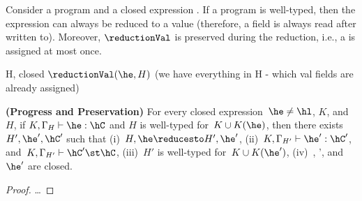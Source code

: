 \documentclass[9pt,a4paper]{article}
\begin{document}
Consider a program \hP and a closed expression \he.
If a program is well-typed, then the expression can always be reduced to a value
    (therefore, a field is always read after written to).
Moreover, $\reductionVal$ is preserved during the reduction,
    i.e., a \hval is assigned at most once.



H, \he closed
$\reductionVal(\he,H)$  (we have everything in H - which val fields are already assigned)



\begin{Theorem}[preservation]
  \textbf{(Progress and Preservation)}
    For every closed expression~$\he \neq \hl$, $K$, and $H$,
        if $K,\Gamma_{H} \vdash \he : \hC$ and $H$ is well-typed for~$K \cup K(\he)$,
        then there exists~$H',\he',\hC'$ such that
        (i)~$H,\he \reducesto H',\he'$,
        (ii)~$K,\Gamma_{H'} \vdash \he':\hC'$,
        and~$K,\Gamma_{H'} \vdash \hC' \st \hC$,
        (iii)~$H'$ is well-typed for~$K \cup K(\he')$,
        (iv)~\hC, \hC', and $\he'$ are closed.
\end{Theorem}
\begin{proof}
\ldots
\end{proof}
\end{document}
